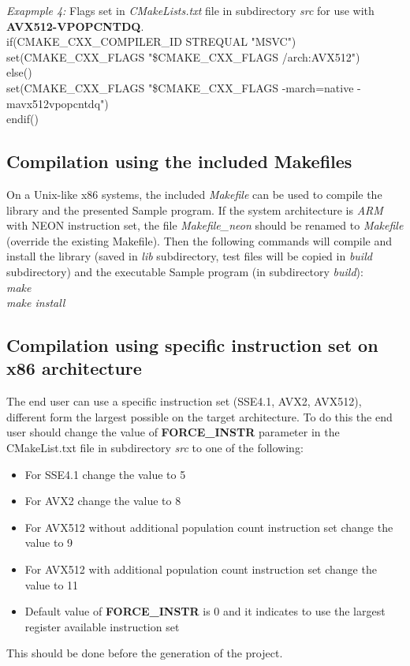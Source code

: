	
	\emph{Exapmple 4:} Flags set in \emph{CMakeLists.txt} file in subdirectory \emph{src} for use with  \textbf{AVX512-VPOPCNTDQ}.\\
	
	if(CMAKE\_CXX\_COMPILER\_ID STREQUAL "MSVC")\\
	set(CMAKE\_CXX\_FLAGS "\${CMAKE\_CXX\_FLAGS} /arch:AVX512")\\
	else()\\
	set(CMAKE\_CXX\_FLAGS "\${CMAKE\_CXX\_FLAGS} -march=native -mavx512vpopcntdq")\\
	endif()	\\
	
	
	
	\subsection{Compilation using the included Makefiles}
	On a Unix-like x86 systems, the included \emph{Makefile} can be used to compile the library and the presented Sample program. If the system architecture is \emph{ARM} with NEON instruction set, the file \emph{Makefile\_neon} should be renamed to \emph{Makefile} (override the existing Makefile). Then the following commands will compile and install the library (saved in \emph{lib} subdirectory, test files will be copied in \emph{build} subdirectory) and the executable Sample program (in subdirectory \emph{build}):\\
	\textit{make\\ make install}\\
	
	\subsection{Compilation using specific instruction set on x86 architecture}
	The end user can use a specific instruction set (SSE4.1, AVX2, AVX512), different form the largest possible on the target architecture. To do this the end user should change the value of \textbf{FORCE\_INSTR} parameter in the CMakeList.txt file in subdirectory \emph{src} to one of the following: 
	\begin{itemize}
		\item For SSE4.1 change the value to 5
		\item For AVX2 change the value to 8
		\item For AVX512 without additional population count instruction set change the value to 9
		\item For AVX512 with additional population count instruction set change the value to 11
		\item Default value of  \textbf{FORCE\_INSTR} is 0 and it indicates to use the largest register available instruction set
	\end{itemize}
	This should be done before the generation of the project.
	
